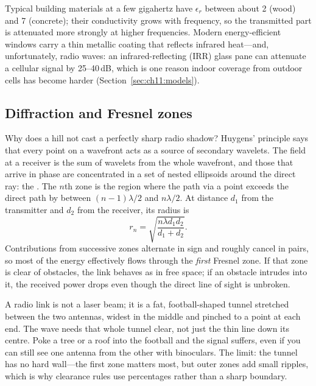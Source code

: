 
Typical building materials at a few gigahertz have $\epsilon_r$ between about 2 (wood) and 7
(concrete); their conductivity grows with frequency, so the transmitted part is attenuated
more strongly at higher frequencies. Modern energy-efficient windows carry a thin metallic
coating that reflects infrared heat---and, unfortunately, radio waves: an infrared-reflecting
(IRR) glass pane can attenuate a cellular signal by 25--40\,dB, which is one reason indoor
coverage from outdoor cells has become harder (Section~\ref{sec:ch11:models}).

\subsection{Diffraction and Fresnel zones}

Why does a hill not cast a perfectly sharp radio shadow? Huygens' principle says that every
point on a wavefront acts as a source of secondary wavelets. The field at a receiver is the sum
of wavelets from the whole wavefront, and those that arrive in phase are concentrated in a set
of nested ellipsoids around the direct ray: the . The $n$th zone is the
region where the path via a point exceeds the direct path by between $(n-1)\lambda/2$ and
$n\lambda/2$. At distance $d_1$ from the transmitter and $d_2$ from the receiver, its radius is
\begin{equation}
r_n=\sqrt{\frac{n\lambda d_1d_2}{d_1+d_2}} .
\label{eq:ch11:fresnel}
\end{equation}
Contributions from successive zones alternate in sign and roughly cancel in pairs, so most of the
energy effectively flows through the \emph{first} Fresnel zone. If that zone is clear of
obstacles, the link behaves as in free space; if an obstacle intrudes into it, the received
power drops even though the direct line of sight is unbroken.

\begin{analogy}
A radio link is not a laser beam; it is a fat, football-shaped tunnel stretched between the two
antennas, widest in the middle and pinched to a point at each end. The wave needs that whole
tunnel clear, not just the thin line down its centre. Poke a tree or a roof into the football and
the signal suffers, even if you can still see one antenna from the other with binoculars. The
limit: the tunnel has no hard wall---the first zone matters most, but outer zones add small
ripples, which is why clearance rules use percentages rather than a sharp boundary.
\end{analogy}

